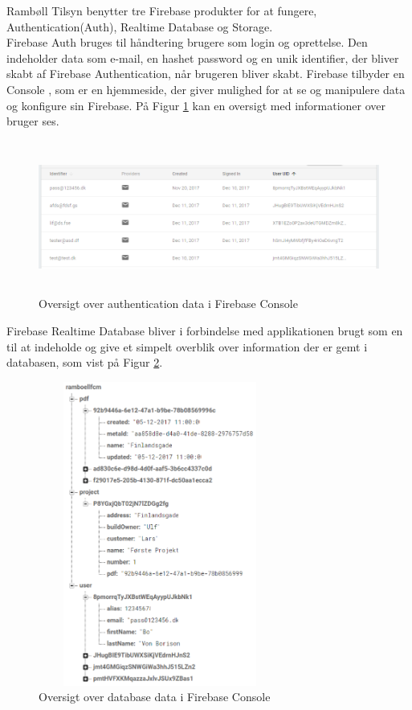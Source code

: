 Rambøll Tilsyn benytter tre Firebase produkter for at fungere, Authentication(Auth), Realtime Database og Storage.\\

 Firebase Auth\cite{FirebaseAuth} bruges til håndtering brugere som login og oprettelse. Den indeholder data som e-mail, en hashet password og en unik identifier, der bliver skabt af Firebase Authentication, når brugeren bliver skabt. Firebase tilbyder en Console , som er en hjemmeside, der giver mulighed for at se og manipulere data og konfigure sin Firebase. På Figur \ref{fig:FirebaseAuthPNG} kan en oversigt med informationer over bruger ses. 
\begin{figure}[H] %
	\centering
	\includegraphics[height=5cm, width=15cm]{../ArkitekturDesign/Design/Firebase/FirebaseAuth.PNG}
	\caption{Oversigt over authentication data i Firebase Console}
	\label{fig:FirebaseAuthPNG}
\end{figure}

Firebase Realtime Database bliver i forbindelse med applikationen brugt som en til at indeholde og give et simpelt overblik over information der er gemt i databasen, som vist på Figur \ref{fig:FirebaseDBPNG}.  
 
\begin{figure}[H] %
	\centering
	\includegraphics[height=10cm, width=8cm]{../ArkitekturDesign/Design/Firebase/FirebaseDB.PNG}
	\caption{Oversigt over database data i Firebase Console}
	\label{fig:FirebaseDBPNG}
\end{figure}

